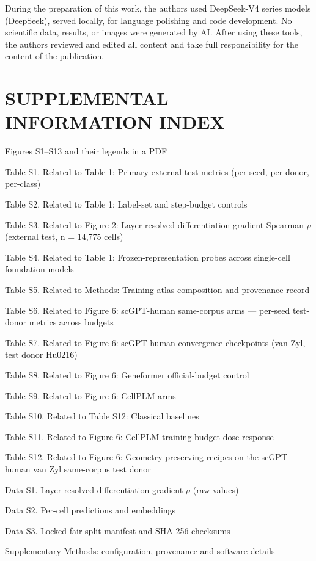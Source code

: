 \documentclass[12pt,letterpaper]{article}
\begin{document}
During the preparation of this work, the authors used DeepSeek-V4 series models (DeepSeek), served locally, for language polishing and code development. No scientific data, results, or images were generated by AI. After using these tools, the authors reviewed and edited all content and take full responsibility for the content of the publication.

\section*{SUPPLEMENTAL INFORMATION INDEX}

\begin{description}
  \item Figures S1--S13 and their legends in a PDF
  \item Table S1. Related to Table 1: Primary external-test metrics (per-seed, per-donor, per-class)
  \item Table S2. Related to Table 1: Label-set and step-budget controls
  \item Table S3. Related to Figure 2: Layer-resolved differentiation-gradient Spearman $\rho$ (external test, n = 14,775 cells)
  \item Table S4. Related to Table 1: Frozen-representation probes across single-cell foundation models
  \item Table S5. Related to Methods: Training-atlas composition and provenance record
  \item Table S6. Related to Figure 6: scGPT-human same-corpus arms --- per-seed test-donor metrics across budgets
  \item Table S7. Related to Figure 6: scGPT-human convergence checkpoints (van Zyl, test donor Hu0216)
  \item Table S8. Related to Figure 6: Geneformer official-budget control
  \item Table S9. Related to Figure 6: CellPLM arms
  \item Table S10. Related to Table S12: Classical baselines
  \item Table S11. Related to Figure 6: CellPLM training-budget dose response
  \item Table S12. Related to Figure 6: Geometry-preserving recipes on the scGPT-human van Zyl same-corpus test donor
  \item Data S1. Layer-resolved differentiation-gradient $\rho$ (raw values)
  \item Data S2. Per-cell predictions and embeddings
  \item Data S3. Locked fair-split manifest and SHA-256 checksums
  \item Supplementary Methods: configuration, provenance and software details
\end{description}

\newpage



\end{document}
